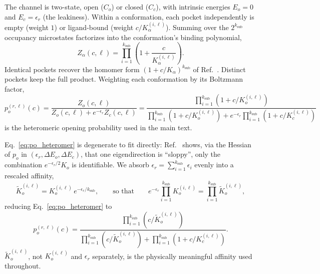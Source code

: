 \documentclass[aps,pre,superscriptaddress,floatfix,longbibliography,linenumbers]{revtex4-2}
\begin{document}
The channel is two-state, open ($C_o$) or closed ($C_c$), with intrinsic
energies $E_o=0$ and $E_c=\epsilon_r$ (the leakiness). Within a
conformation, each pocket independently is empty (weight $1$) or
ligand-bound (weight $c/K_\alpha^{(i,\ell)}$). Summing over the
$2^{k_\text{sub}}$ occupancy microstates factorizes into the conformation's
binding polynomial,
\begin{equation}
Z_\alpha(c,\ell) = \prod_{i=1}^{k_\text{sub}}\left(1+\frac{c}{K_\alpha^{(i,\ell)}}\right).
\label{eq:binding_poly}
\end{equation}
Identical pockets recover the homomer form
$(1+c/K_\alpha)^{k_\text{sub}}$ of Ref.~\cite{einav_monod-wyman-changeux_2017}.
Distinct pockets keep the full product. Weighting each conformation by its
Boltzmann factor,
\begin{equation}
p_o^{(r,\ell)}(c) = \frac{Z_o(c,\ell)}{Z_o(c,\ell) + e^{-\epsilon_r} Z_c(c,\ell)}
= \frac{\prod_{i=1}^{k_\text{sub}} (1+c/K_o^{(i,\ell)})}{\prod_{i=1}^{k_\text{sub}} (1+c/K_o^{(i,\ell)}) + e^{-\epsilon_r}\prod_{i=1}^{k_\text{sub}}(1+c/K_c^{(i,\ell)})}
\label{eq:po_heteromer}
\end{equation}
is the heteromeric opening probability used in the main text.

Eq.~\eqref{eq:po_heteromer} is degenerate to fit directly:
Ref.~\cite{einav_monod-wyman-changeux_2017} shows, via the Hessian of $p_o$
in $(\epsilon_r,\Delta E_o,\Delta E_c)$, that one eigendirection is
``sloppy'', only the combination $e^{-\epsilon_r/2}K_o$ is identifiable. We
absorb $\epsilon_r=\sum_{i=1}^{k_\text{sub}}\epsilon_i$ evenly into a
rescaled affinity,
\begin{equation}
\tilde K_o^{(i,\ell)} = K_o^{(i,\ell)}\, e^{-\epsilon_r/k_\text{sub}},
\qquad\text{so that}\qquad
e^{-\epsilon_r}\prod_{i=1}^{k_\text{sub}} K_o^{(i,\ell)} = \prod_{i=1}^{k_\text{sub}} \tilde K_o^{(i,\ell)},
\label{eq:Ko_tilde}
\end{equation}
reducing Eq.~\eqref{eq:po_heteromer} to
\begin{equation}
p_o^{(r,\ell)}(c) = \frac{\prod_{i=1}^{k_\text{sub}} (c/\tilde K_o^{(i,\ell)})}{\prod_{i=1}^{k_\text{sub}}(c/\tilde K_o^{(i,\ell)}) + \prod_{i=1}^{k_\text{sub}}(1+c/K_c^{(i,\ell)})}.
\label{eq:po_rescaled}
\end{equation}
$\tilde K_o^{(i,\ell)}$, not $K_o^{(i,\ell)}$ and $\epsilon_r$ separately, is
the physically meaningful affinity used throughout.
\end{document}
